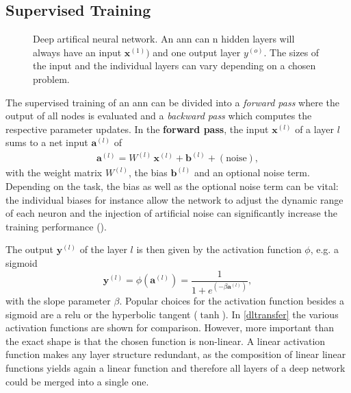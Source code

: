 

\subsection{Supervised Training}
\label{supervisedtraining}
\begin{figure}
	\centering
	
	\caption[Deep artifical neural network]{Deep artifical neural network. An \acrfull{ann} can n hidden layers will always have an input $\mathbf{x}^{(1)})$ and one output layer $y^{(o)}$. The sizes of the input and the individual layers can vary depending on a chosen problem.} 
	\label{multilayernetwork}
\end{figure}
The supervised training of an \gls{ann} can be divided into a \emph{forward pass} where the output of all nodes is evaluated and a \emph{backward pass} which computes the respective parameter updates. In the \textbf{forward pass}, the input $\mathbf{x}^{(l)}$ of a layer $l$ sums to a net input $\mathbf{a}^{(l)}$ of
\begin{align*}
\mathbf{a}^{(l)} = W^{(l)} \, \mathbf{x}^{(l)} + \mathbf{b}^{(l)} + \left(\text{noise}\right), 
\end{align*}
with the weight matrix $W^{(l)}$, the bias $\mathbf{b}^{(l)}$ and an optional noise term. Depending on the task, the bias as well as the optional noise term can be vital: the individual biases for instance allow the network to adjust the dynamic range of each neuron and the injection of artificial noise can significantly increase the training performance (\citealp{an1996effects}).

The output $\mathbf{y}^{(l)}$ of the layer $l$ is then given by the activation function $\phi$, e.g. a sigmoid
\begin{equation*}
\mathbf{y}^{(l)} = \phi(\mathbf{a}^{(l)}) = \frac{1}{1 + e^{(-\beta \mathbf{a}^{(l)})}},
\end{equation*}
with the slope parameter $\beta$. Popular choices for the activation function besides a sigmoid are a \gls{relu} or the hyperbolic tangent ($\tanh$). In \cref{dltransfer} the various activation functions are shown for comparison. However, more important than the exact shape is that the chosen function is non-linear. A linear activation function makes any layer structure redundant, as the composition of linear linear functions yields again a linear function and therefore all layers of a deep network could be merged into a single one.

